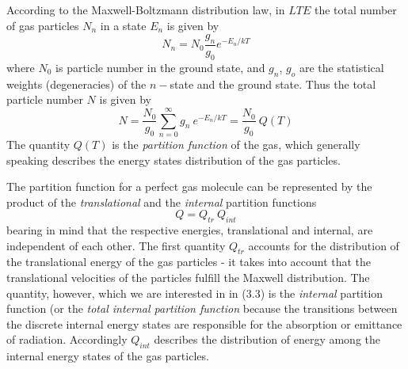 According  to the Maxwell-Boltzmann distribution law, in $LTE$ the total number
of gas particles $N_n$  in a state $E_n$ is given by 
\begin{equation}
 N_n=N_0\frac{g_n}{g_0}e^{-E_n/kT}
\end{equation}
where $N_0$ is particle number in the ground state, and $g_n$, $g_o$
are the statistical weights (degeneracies) of the $n-$state and the
ground state. Thus the total particle number $N$ is given by
\begin{equation}
 N=\frac{N_0}{g_0}\sum_{n=0}^\infty g_n~e^{-E_n/kT}=\frac{N_0}{g_0}~Q(T)
\end{equation}
The quantity $Q(T)$ is the {\it{partition function}\nocorr} of the
gas, which generally speaking describes the energy states distribution
of the gas particles. 

The partition function for a perfect gas molecule can be represented
by the product of the {\it{translational}\nocorr} and the
{\it{internal}\nocorr} partition functions
\begin{equation}
 Q  =  Q_{tr}~Q_{int}
\end{equation}
bearing in mind that the respective energies, translational and
internal, are independent of each other. The first quantity $Q_{tr}$ accounts
for the distribution of the translational energy of the gas particles
- it takes into account that the translational velocities of the
particles fulfill the Maxwell distribution. The quantity, however,
which we are interested in in (3.3) is the {\it{internal}\nocorr}
partition function (or the {\it{total internal partition  function}\nocorr}
 because the transitions between the discrete
internal energy states are responsible for the absorption or emittance
of radiation. Accordingly $Q_{int}$ describes the
distribution of energy among the internal energy states of the gas
particles.

